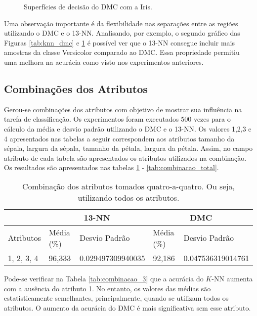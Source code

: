 \documentclass{article}
\begin{document}
\begin{figure}[!h]
\begin{center}
\caption{Superfícies de decisão do DMC com a Iris.}
\label{img:dmc_sd}
\end{center}
\end{figure}

Uma observação importante é da flexibilidade nas separações entre as regiões utilizando o DMC e o 13-NN. Analisando, por exemplo, o segundo gráfico das Figuras \ref{tab:knn_dmc} e \ref{img:dmc_sd} é possível ver que o 13-NN consegue incluir mais amostras da classe Versicolor comparado ao DMC. Essa propriedade permitiu uma melhora na acurácia como visto nos experimentos anteriores.

\subsection{Combinações dos Atributos}
Gerou-se combinações dos atributos com objetivo de mostrar sua influência na tarefa de classificação. Os experimentos foram executados 500 vezes para o cálculo da média e desvio padrão utilizando o DMC e o 13-NN. Os valores 1,2,3 e 4 apresentados nas tabelas a seguir correspondem aos atributos tamanho da sépala, largura da sépala, tamanho da pétala, largura da pétala. Assim, no campo atributo de cada tabela são apresentados os atributos utilizados na combinação. Os resultados são apresentados nas tabelas \ref{tab:combinacao_4} - \ref{tab:combinacao_total}.

\begin{table}[!h]
	\centering
	\vspace{0.5cm}
\begin{tabular}{l|l|l|l|l|}
\cline{2-5}
                                & \multicolumn{2}{c|}{13-NN} & \multicolumn{2}{c|}{DMC}   \\ \hline
\multicolumn{1}{|l|}{Atributos} & Média (\%) & Desvio Padrão & Média (\%) & Desvio Padrão \\ \hline
\multicolumn{1}{|l|}{1, 2, 3, 4} & 96,333 & \num{0,029497309940035} & 92,186 & \num{0,047536319014761} \\ \hline
\end{tabular}
\caption{Combinação dos atributos tomados quatro-a-quatro. Ou seja, utilizando todos os atributos.}\label{tab:combinacao_4}
\end{table}

Pode-se verificar na Tabela \ref{tab:combinacao_3} que a acurácia do $K$-NN aumenta com a ausência do atributo 1. No entanto, os valores das médias são estatisticamente semelhantes, principalmente, quando se utilizam todos os atributos. O aumento da acurácia do DMC é mais significativa sem esse atributo.
\end{document}
